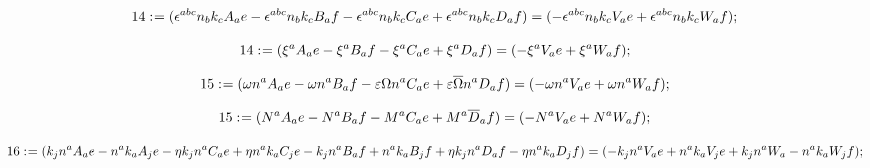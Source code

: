 \documentclass[11pt]{article}
\def\specialcolon{\mathrel{\mathop{:}}\hspace{-.5em}}
\renewcommand{\bar}[1]{\overline{#1}}
\begin{document}
\begin{dmath*}[compact, spread=2pt]
14\specialcolon{}= ({\epsilon}^{a b c} {n}_{b} {k}_{c} {A}_{a} e - {\epsilon}^{a b c} {n}_{b} {k}_{c} {B}_{a} f - {\epsilon}^{a b c} {n}_{b} {k}_{c} {C}_{a} e + {\epsilon}^{a b c} {n}_{b} {k}_{c} {D}_{a} f) = ( - {\epsilon}^{a b c} {n}_{b} {k}_{c} {V}_{a} e + {\epsilon}^{a b c} {n}_{b} {k}_{c} {W}_{a} f);
\end{dmath*}

\begin{dmath*}[compact, spread=2pt]
14\specialcolon{}= ({\xi}^{a} {A}_{a} e - {\xi}^{a} {B}_{a} f - {\xi}^{a} {C}_{a} e + {\xi}^{a} {D}_{a} f) = ( - {\xi}^{a} {V}_{a} e + {\xi}^{a} {W}_{a} f);
\end{dmath*}

\begin{dmath*}[compact, spread=2pt]
15\specialcolon{}= (\omega {n}^{a} {A}_{a} e - \omega {n}^{a} {B}_{a} f - \varepsilon \Omega {n}^{a} {C}_{a} e + \varepsilon \bar \Omega {n}^{a} {D}_{a} f) = ( - \omega {n}^{a} {V}_{a} e + \omega {n}^{a} {W}_{a} f);
\end{dmath*}

\begin{dmath*}[compact, spread=2pt]
15\specialcolon{}= ({N}^{a} {A}_{a} e - {N}^{a} {B}_{a} f - {M}^{a} {C}_{a} e + {M}^{a} \bar {D}_{a} f) = ( - {N}^{a} {V}_{a} e + {N}^{a} {W}_{a} f);
\end{dmath*}

\begin{dmath*}[compact, spread=2pt]
16\specialcolon{}= ({k}_{j} {n}^{a} {A}_{a} e - {n}^{a} {k}_{a} {A}_{j} e - \eta {k}_{j} {n}^{a} {C}_{a} e + \eta {n}^{a} {k}_{a} {C}_{j} e - {k}_{j} {n}^{a} {B}_{a} f + {n}^{a} {k}_{a} {B}_{j} f + \eta {k}_{j} {n}^{a} {D}_{a} f - \eta {n}^{a} {k}_{a} {D}_{j} f) = ( - {k}_{j} {n}^{a} {V}_{a} e + {n}^{a} {k}_{a} {V}_{j} e + {k}_{j} {n}^{a} {W}_{a} - {n}^{a} {k}_{a} {W}_{j} f);
\end{dmath*}
\end{document}
